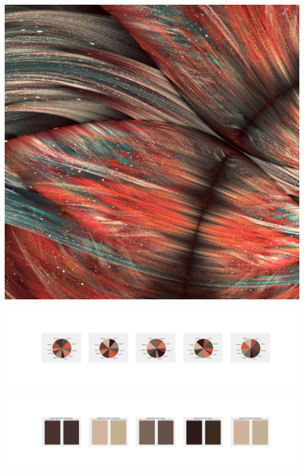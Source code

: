 \documentclass[11pt]{article}
\begin{document}
\begin{landscape}
    \begin{center}
    \includegraphics[width=\textwidth]{./nbimg/file (403).jpg}
    \end{center}

    \begin{center}
    \includegraphics[width=250mm]{./nbimg/pie-338.jpg}
    \end{center}

    \begin{center}
    \includegraphics[width=250mm]{./nbimg/peak-338.jpg}
    \end{center}
    


\end{landscape}
\end{document}
